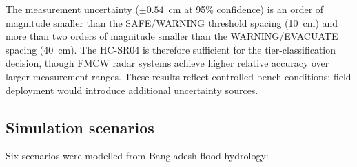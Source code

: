 \documentclass[5p,twocolumn]{elsarticle}
\begin{document}
\begin{table}[htbp]
  \caption{Water level measurement accuracy comparison. Range-normalized error = MAE / range span $\times 100\%$. The HC-SR04 is adequate for tier classification (threshold spacing 10--40~cm vs. measurement uncertainty $\pm0.54$~cm) at a fraction of the cost of FMCW radar systems.}
  \label{tab:lit_compare}
  \centering
  \scriptsize
  \setlength{\tabcolsep}{2pt}
\end{table}

The measurement uncertainty ($\pm0.54$~cm at 95\% confidence) is an order of magnitude smaller than the SAFE/WARNING threshold spacing (10~cm) and more than two orders of magnitude smaller than the WARNING/EVACUATE spacing (40~cm). The HC-SR04 is therefore sufficient for the tier-classification decision, though FMCW radar systems achieve higher relative accuracy over larger measurement ranges. These results reflect controlled bench conditions; field deployment would introduce additional uncertainty sources.

\subsection{Simulation scenarios}

Six scenarios were modelled from Bangladesh flood hydrology:
\end{document}
